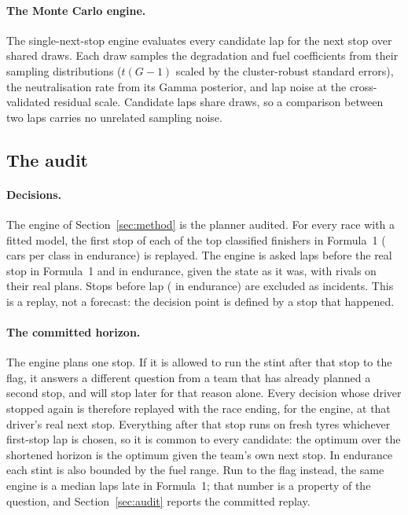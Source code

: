 \documentclass[11pt,a4paper]{article}
\begin{document}
\paragraph{The Monte Carlo engine.} The single-next-stop engine evaluates every
candidate lap for the next stop over \NDraws{} shared draws. Each draw samples
the degradation and fuel coefficients from their sampling distributions ($t(G-1)$
scaled by the cluster-robust standard errors), the neutralisation rate from its
Gamma posterior, and lap noise at the cross-validated residual scale. Candidate
laps share draws, so a comparison between two laps carries no unrelated
sampling noise.

\subsection{The audit}
\label{sec:auditprotocol}

\paragraph{Decisions.} The engine of Section~\ref{sec:method} is the planner
audited. For every race with a fitted model, the first stop of
each of the top \NFinishers{} classified finishers in Formula~1 (\NCars{} cars
per class in endurance) is replayed. The engine is asked \LookbackFone{} laps
before the real stop in Formula~1 and \LookbackEnd{} in endurance, given the
state as it was, with rivals on their real plans. Stops before lap
\MinFirstStopFone{} (\MinFirstStopEnd{} in endurance) are excluded as incidents.
This is a replay, not a forecast: the decision point is defined by a stop that
happened.

\paragraph{The committed horizon.} The engine plans one stop. If it is allowed to
run the stint after that stop to the flag, it answers a different question from
a team that has already planned a second stop, and will stop later for that
reason alone. Every decision whose driver stopped again is therefore replayed
with the race ending, for the engine, at that driver's real next stop.
Everything after that stop runs on fresh tyres whichever first-stop lap is
chosen, so it is common to every candidate: the optimum over the shortened
horizon is the optimum given the team's own next stop. In endurance each stint
is also bounded by the fuel range. Run to the flag instead, the same engine is a
median \FoneMedian{} laps late in Formula~1; that number is a property of the
question, and Section~\ref{sec:audit} reports the committed replay.
\end{document}
